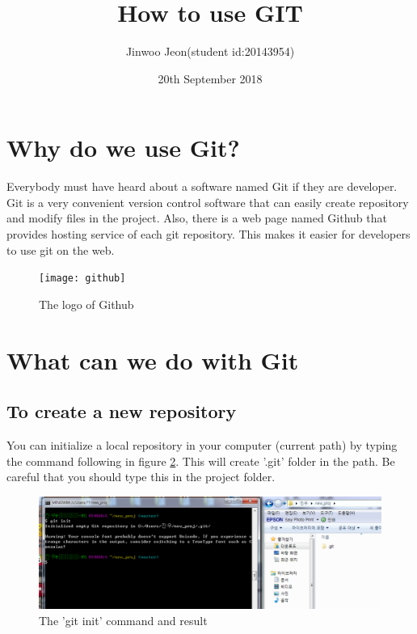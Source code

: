 \documentclass{article}
\title{\textbf{How to use GIT}}
\author{Jinwoo Jeon(student id:20143954) }
\date{20th September 2018}
\begin{document}
\maketitle

\section{Why do we use Git?}
Everybody must have heard about a software named Git if they are developer. Git is a very convenient version control software that can easily create repository and modify files in the project. Also, there is a web page named Github that provides hosting service of each git repository. This makes it easier for developers to use git on the web.


\begin{figure}[h!]
\centering
\texttt{[image: github]}
\caption{The logo of Github}
\label{fig:universe}
\end{figure}




\section{What can we do with Git}

    \subsection{To create a new repository}
    You can initialize a local repository in your computer (current path) by typing the command following in figure \ref{fig:init}. This will create '.git' folder in the path. Be careful that you should type this in the project folder.
    \begin{figure}[h!]
    \centering
    \includegraphics[scale=0.5]{git_init}
    \caption{The 'git init' command and result}
    \label{fig:init}
    \end{figure}
    
    
\end{document}
